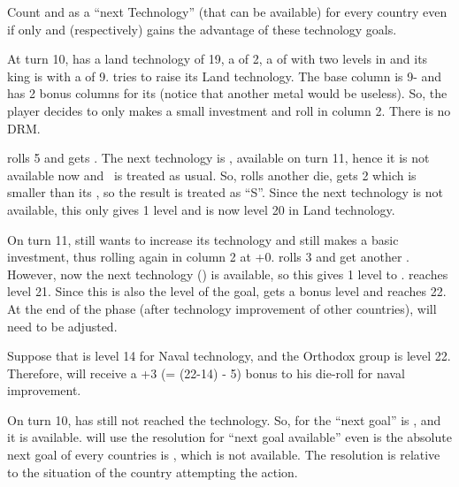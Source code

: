 \bparag Count \TTER and \TVGA as a ``next Technology'' (that can be available)
for every country even if only \SPA and \VEN (respectively) gains the
advantage of these technology goals.


\begin{exemple}
  At turn 10, \FRA has a land technology of 19, a \FTI of 2, a \MNU of
   with two levels in \provinceChampagne and its king is
   with a \MIL of 9. \FRA tries to raise its Land
  technology. The base column is 9- and \FRA has 2 bonus columns for its
  \MNU (notice that another metal \MNU would be useless). So, the player
  decides to only makes a small investment and roll in column 2. There is no
  DRM.

  \FRA rolls 5 and gets \undemi. The next technology is \TARQ, available on
  turn 11, hence it is not available now and \undemi\ is treated as usual. So,
  \FRA rolls another die, gets 2 which is smaller than its \FTI, so the result
  is treated as ``S''. Since the next technology is not available, this only
  gives 1 level and \FRA is now level 20 in Land technology.
\end{exemple}

\begin{exemple}
  On turn 11, \FRA still wants to increase its technology and still makes a
  basic investment, thus rolling again in column 2 at +0. \FRA rolls 3 and get
  another \undemi. However, now the next technology (\TARQ) is available, so
  this gives 1 level to \FRA. \FRA reaches level 21. Since this is also the
  level of the \TARQ goal, \FRA gets a bonus level and reaches 22. At the end
  of the phase (after technology improvement of other countries), \TARQ will
  need to be adjusted.
\end{exemple}

\begin{exemple}
  Suppose that \RUS is level 14 for Naval technology, and the Orthodox group
  is level 22. Therefore, \RUS will receive a +3 (= (22-14) - 5) bonus to his
  die-roll for naval improvement.
\end{exemple}

\begin{exemple}
  On turn 10, \RUS has still not reached the \TREN technology. So, for \RUS
  the ``next goal'' is \TREN, and it is available. \RUS will use the
  resolution for ``next goal available'' even is the absolute next goal of
  every countries is \TARQ, which is not available. The resolution is relative
  to the situation of the country attempting the action.
\end{exemple}


